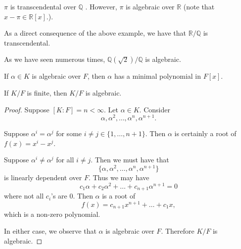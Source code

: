 \documentclass[notoc,notitlepage,nobib]{tufte-book}
\begin{document}
\begin{eg}
  $\pi$ is transcendental over $\mathbb{Q}$ . However, $\pi$ is algebraic over $\mathbb{R}$ (note that $x - \pi \in \mathbb{R}[x]$.).
\end{eg}

\begin{eg}
  As a direct consequence of the above example, we have that $\mathbb{R}/\mathbb{Q}$ is transcendental.
\end{eg}

\begin{eg}
  As we have seen numerous times, $\mathbb{Q}(\sqrt{2}) / \mathbb{Q}$ is algebraic.
\end{eg}

\begin{remark}
  If $\alpha \in K$ is algebraic over $F$, then $\alpha$ has a minimal polynomial in $F[x]$.
\end{remark}

\begin{thm}\label{thm:finite_extensions_are_algebraic}
  If $K / F$ is finite, then $K / F$ is algebraic.
\end{thm}

\begin{proof}
  Suppose $[K : F] = n < \infty$. Let $\alpha \in K$. Consider
  \begin{equation*}
    \alpha, \alpha^2, \ldots, \alpha^n, \alpha^{n + 1}.
  \end{equation*}

  \noindent
   Suppose $\alpha^i = \alpha^j$ for some $i \neq j \in \{ 1, \ldots, n + 1\}$. Then
  $\alpha$ is certainly a root of $f(x) = x^i - x^j$.

  \noindent
   Suppose $\alpha^i \neq \alpha^j$ for all $i \neq j$. Then we must have that
  \begin{equation*}
    \{\alpha, \alpha^2, \ldots, \alpha^n, \alpha^{n + 1}\}
  \end{equation*}
  is linearly dependent over $F$. Thus we may have
  \begin{equation*}
    c_1 \alpha + c_2 \alpha^2 + \hdots + c_{n + 1} \alpha^{n + 1} = 0
  \end{equation*}
  where not all $c_i$'s are $0$. Then $\alpha$ is a root of
  \begin{equation*}
    f(x) = c_{n+1} x^{n+1} + \hdots + c_1 x,
  \end{equation*}
  which is a non-zero polynomial.

  In either case, we observe that $\alpha$ is algebraic over $F$. Therefore $K / F$ is algebraic.
\end{proof}
\end{document}
